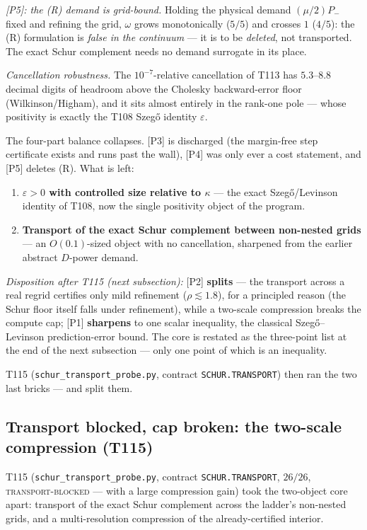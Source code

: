 \documentclass[11pt,a4paper]{article}
\begin{document}
\emph{[P5]: the (R) demand is grid-bound.} Holding the physical demand $(\mu/2)P_-$ fixed and
refining the grid, $\omega$ grows monotonically ($5/5$) and crosses $1$ ($4/5$): the (R)
formulation is \emph{false in the continuum} --- it is to be \emph{deleted}, not transported.
The exact Schur complement needs no demand surrogate in its place.

\emph{Cancellation robustness.} The $10^{-7}$-relative cancellation of T113 has $5.3$--$8.8$
decimal digits of headroom above the Cholesky backward-error floor (Wilkinson/Higham), and it
sits almost entirely in the rank-one pole --- whose positivity is exactly the T108 Szeg\H{o}
identity $\varepsilon$.

\begin{keybox}
The four-part balance collapses. [P3] is discharged (the margin-free step certificate exists and
runs past the wall), [P4] was only ever a cost statement, and [P5] deletes (R). What is left:
\begin{enumerate}[leftmargin=1.6em]
\item[\textbf{[P1]}] \textbf{$\varepsilon>0$ with controlled size relative to $\kappa$} --- the
exact Szeg\H{o}/Levinson identity of T108, now the single positivity object of the program.
\item[\textbf{[P2]}] \textbf{Transport of the exact Schur complement between non-nested grids}
--- an $O(0.1)$-sized object with no cancellation, sharpened from the earlier abstract
$D$-power demand.
\end{enumerate}
\emph{Disposition after T115 (next subsection):} [P2] \textbf{splits} --- the transport across a
real regrid certifies only mild refinement ($\rho\lesssim1.8$), for a principled reason (the
Schur floor itself falls under refinement), while a two-scale compression breaks the compute cap;
[P1] \textbf{sharpens} to one scalar inequality, the classical Szeg\H{o}--Levinson
prediction-error bound. The core is restated as the three-point list at the end of the next
subsection --- only one point of which is an inequality.
\end{keybox}

\noindent T115 (\texttt{schur\_transport\_probe.py}, contract \texttt{SCHUR.TRANSPORT}) then ran
the two last bricks --- and split them.

\subsection{Transport blocked, cap broken: the two-scale compression (T115)}
T115 (\texttt{schur\_transport\_probe.py}, contract \texttt{SCHUR.TRANSPORT}, $26/26$,
\textsc{transport-blocked} --- with a large compression gain) took the two-object core apart:
transport of the exact Schur complement across the ladder's non-nested grids, and a
multi-resolution compression of the already-certified interior.
\end{document}
